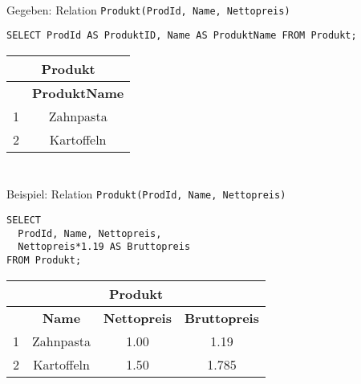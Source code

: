 \begin{frame}[fragile]\frametitle{\insertsection}
\framesubtitle{\insertsubsection}
\\[4pt]
Gegeben: Relation \texttt{Produkt(ProdId, Name, Nettopreis)}
\abs
\begin{lstlisting}[xleftmargin=3ex, numbers=none]
SELECT ProdId AS ProduktID, Name AS ProduktName FROM Produkt;
\end{lstlisting}
\abs
{}
\begin{center}
	\begin{tabular}{|c|c|}\hline
		\multicolumn{2}{|c|}{\footnotesize \textbf{Produkt}}\\\hline\hline
		\footnotesize \textbf{\key{ProduktID}} & \footnotesize \textbf{ProduktName}  \\\hline
		\footnotesize 1 &\footnotesize Zahnpasta \\\hline
		\footnotesize 2 & \footnotesize Kartoffeln \\\hline
	\end{tabular}
\end{center}
\end{frame}

\begin{frame}[fragile]\frametitle{\insertsection}
\framesubtitle{\insertsubsection}
\onslide
{}\\[4pt]
Beispiel: Relation \texttt{Produkt(ProdId, Name, Nettopreis)}
\begin{lstlisting}[xleftmargin=3ex]
SELECT
  ProdId, Name, Nettopreis,
  Nettopreis*1.19 AS Bruttopreis
FROM Produkt;
\end{lstlisting}
\pause
{}
\begin{center}
\begin{tabular}{|c|c|c|c|}\hline
			\multicolumn{4}{|c|}{\footnotesize \textbf{Produkt}}\\\hline\hline
			 \footnotesize \textbf{\key{ProdId}} & \footnotesize \textbf{Name} & \footnotesize \textbf{Nettopreis} &  \footnotesize \textbf{Bruttopreis}  \\\hline
			\footnotesize 1 &\footnotesize Zahnpasta & 1.00 & 1.19 \\\hline
			\footnotesize 2 & \footnotesize Kartoffeln & 1.50 & 1.785\\\hline
\end{tabular}
\end{center}
\end{frame}

